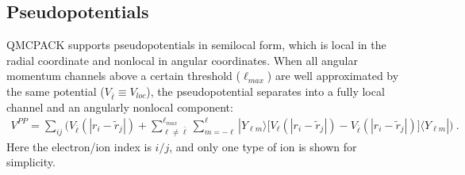 \documentclass[letterpaper,10pt,english]{sphinxmanual}
\begin{document}
\def\sphinxLiteralBlockLabel{\label{\detokenize{hamiltonianobservable:listing-17}}}
\begin{sphinxVerbatim}[commandchars=\\\{\}]
     
\end{sphinxVerbatim}
\def\sphinxLiteralBlockLabel{\label{\detokenize{hamiltonianobservable:listing-18}}}
\begin{sphinxVerbatim}[commandchars=\\\{\}]
      
\end{sphinxVerbatim}


\subsection{Pseudopotentials}
\label{\detokenize{hamiltonianobservable:pseudopotentials}}\label{\detokenize{hamiltonianobservable:nlpp}}
QMCPACK supports pseudopotentials in semilocal form, which is local in the
radial coordinate and nonlocal in angular coordinates. When all angular
momentum channels above a certain threshold (\(\ell_{max}\)) are
well approximated by the same potential
(\(V_{\bar{\ell}}\equiv V_{loc}\)), the pseudopotential separates
into a fully local channel and an angularly nonlocal component:
\begin{equation}\label{equation:hamiltonianobservable:eq31}
\begin{split}V^{PP} = \sum_{ij}\Big(V_{\bar{\ell}}(\left|{r_i-\tilde{r}_j}\right|) + \sum_{\ell\ne\bar{\ell}}^{\ell_{max}}\sum_{m=-\ell}^\ell |{Y_{\ell m}}\rangle{\big[V_\ell(\left|{r_i-\tilde{r}_j}\right|) - V_{\bar{\ell}}(\left|{r_i-\tilde{r}_j}\right|) \big]}\langle{Y_{\ell m}}| \Big)\:.\end{split}
\end{equation}
Here the electron/ion index is \(i/j\), and only one type of ion is
shown for simplicity.
\end{document}

